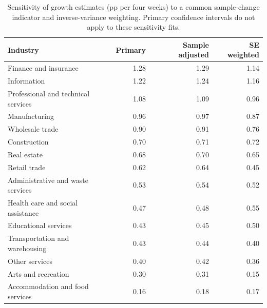 \begin{table}[H]
\centering
\small
\caption{Sensitivity of growth estimates (pp per four weeks) to a common sample-change indicator and inverse-variance weighting. Primary confidence intervals do not apply to these sensitivity fits.}\label{tab:sensitivity}
\begin{tabular}{lrrr}
\toprule
Industry & Primary & Sample adjusted & SE weighted \\
\midrule
Finance and insurance & 1.28 & 1.29 & 1.14 \\
Information & 1.22 & 1.24 & 1.16 \\
Professional and technical services & 1.08 & 1.09 & 0.96 \\
Manufacturing & 0.96 & 0.97 & 0.87 \\
Wholesale trade & 0.90 & 0.91 & 0.76 \\
Construction & 0.70 & 0.71 & 0.72 \\
Real estate & 0.68 & 0.70 & 0.65 \\
Retail trade & 0.62 & 0.64 & 0.45 \\
Administrative and waste services & 0.53 & 0.54 & 0.52 \\
Health care and social assistance & 0.47 & 0.48 & 0.55 \\
Educational services & 0.43 & 0.45 & 0.50 \\
Transportation and warehousing & 0.43 & 0.44 & 0.40 \\
Other services & 0.40 & 0.42 & 0.36 \\
Arts and recreation & 0.30 & 0.31 & 0.15 \\
Accommodation and food services & 0.16 & 0.18 & 0.17 \\
\bottomrule
\end{tabular}
\end{table}
